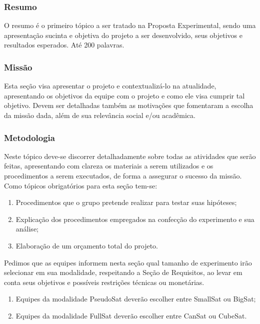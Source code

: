        \subsubsection{Resumo}
            O resumo é o primeiro tópico a ser tratado na Proposta Experimental, sendo uma apresentação sucinta e objetiva do projeto a ser desenvolvido, seus objetivos e resultados esperados. Até 200 palavras.
                
        \subsubsection{Missão}
            Esta seção visa apresentar o projeto e contextualizá-lo na atualidade, apresentando os objetivos da equipe com o projeto e como ele visa cumprir tal objetivo. Devem ser detalhadas também as motivações que fomentaram a escolha da missão dada, além de sua relevância social e/ou acadêmica.
                
        \subsubsection{Metodologia}
            Neste tópico deve-se discorrer detalhadamente sobre todas as atividades que serão feitas, apresentando com clareza os materiais a serem utilizados e os procedimentos a serem executados, de forma a assegurar o sucesso da missão. Como tópicos obrigatórios para esta seção tem-se:
            \begin{enumerate}
                \item Procedimentos que o grupo pretende realizar para testar suas hipóteses;
                \item Explicação dos procedimentos empregados na confecção do experimento e sua análise;
                \item Elaboração de um orçamento total do projeto.
            \end{enumerate}

            Pedimos que as equipes informem nesta seção qual tamanho de experimento irão selecionar em sua modalidade, respeitando a Seção de Requisitos, ao levar em conta seus objetivos e possíveis restrições técnicas ou monetárias.
            \begin{enumerate}
                \item Equipes da modalidade PseudoSat deverão escolher entre SmallSat ou BigSat;
                \item Equipes da modalidade FullSat deverão escolher entre CanSat ou CubeSat.
            \end{enumerate}

